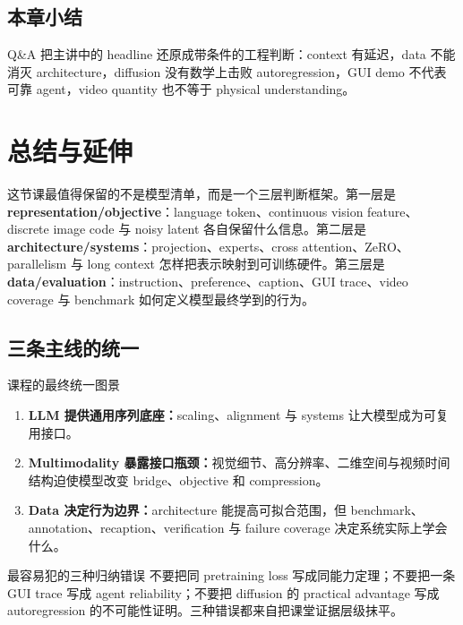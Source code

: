 \documentclass[a4paper]{article}
\begin{document}
\subsection{本章小结}

Q\&A 把主讲中的 headline 还原成带条件的工程判断：context 有延迟，data 不能消灭 architecture，diffusion 没有数学上击败 autoregression，GUI demo 不代表可靠 agent，video quantity 也不等于 physical understanding。

\section{总结与延伸}

这节课最值得保留的不是模型清单，而是一个三层判断框架。第一层是 \textbf{representation/objective}：language token、continuous vision feature、discrete image code 与 noisy latent 各自保留什么信息。第二层是 \textbf{architecture/systems}：projection、experts、cross attention、ZeRO、parallelism 与 long context 怎样把表示映射到可训练硬件。第三层是 \textbf{data/evaluation}：instruction、preference、caption、GUI trace、video coverage 与 benchmark 如何定义模型最终学到的行为。

\subsection{三条主线的统一}

\begin{importantbox}{课程的最终统一图景}
\begin{enumerate}
  \item \textbf{LLM 提供通用序列底座：}scaling、alignment 与 systems 让大模型成为可复用接口。
  \item \textbf{Multimodality 暴露接口瓶颈：}视觉细节、高分辨率、二维空间与视频时间结构迫使模型改变 bridge、objective 和 compression。
  \item \textbf{Data 决定行为边界：}architecture 能提高可拟合范围，但 benchmark、annotation、recaption、verification 与 failure coverage 决定系统实际上学会什么。
\end{enumerate}
\end{importantbox}

\begin{warningbox}{最容易犯的三种归纳错误}
不要把同 pretraining loss 写成同能力定理；不要把一条 GUI trace 写成 agent reliability；不要把 diffusion 的 practical advantage 写成 autoregression 的不可能性证明。三种错误都来自把课堂证据层级抹平。
\end{warningbox}
\end{document}
